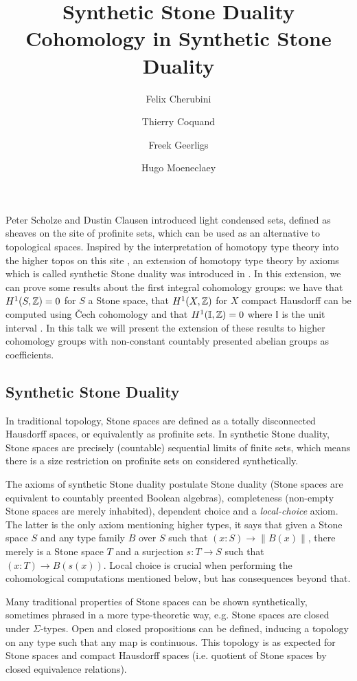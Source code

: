 \documentclass{../util/zariski}
\title{Synthetic Stone Duality 
}
\author{
Felix Cherubini %
\and 
 Thierry Coquand%
\and 
 Freek Geerligs%
\and
 Hugo Moeneclaey %
}
\title{Cohomology in Synthetic Stone Duality}
\begin{document}
\maketitle
Peter Scholze and Dustin Clausen \cite{Scholze} introduced light condensed sets, defined as sheaves on the site of profinite sets, which can be used as an alternative to topological spaces. 
Inspired by the interpretation of homotopy type theory into the higher topos on this site \cite{shulman2019all}, an extension of homotopy type theory by axioms which is called synthetic Stone duality was introduced in \cite{synthetic-stone-duality}. In this extension, we can prove some results about the first integral cohomology groups: we have that $H^1(S,\mathbb{Z}) = 0$ for $S$ a Stone space, that $H^1(X,\mathbb{Z})$ for $X$ compact Hausdorff can be computed using \v{C}ech cohomology and that $H^1(\mathbb{I},\mathbb{Z}) = 0$ where $\mathbb{I}$ is the unit interval \cite{synthetic-stone-duality}. In this talk we will present the extension of these results to higher cohomology groups with non-constant countably presented abelian groups as coefficients.

\subsection*{Synthetic Stone Duality}

In traditional topology, Stone spaces are defined as a totally disconnected Hausdorff spaces, or equivalently as profinite sets. In synthetic Stone duality, Stone spaces are precisely (countable) sequential limits of finite sets, which means there is a size restriction on profinite sets on considered synthetically. 

The axioms of synthetic Stone duality postulate Stone duality (Stone spaces are equivalent to countably preented Boolean algebras), completeness (non-empty Stone spaces are merely inhabited), dependent choice and a \emph{local-choice} axiom. The latter is the only axiom mentioning higher types, it says that given a Stone space $S$ and any type family $B$ over $S$ such that $(x:S)\to \| B(x)  \|$, there merely is a Stone space $T$ and a surjection $s:T\to S$ such that $(x:T)\to B(s(x))$. Local choice is crucial when performing the cohomological computations mentioned below, but has consequences beyond that.

Many traditional properties of Stone spaces can be shown synthetically, sometimes phrased in a more type-theoretic way, e.g. Stone spaces are closed under $\Sigma$-types. Open and closed propositions can be defined, inducing a topology on any type such that any map is continuous. This topology is as expected for Stone spaces and compact Hausdorff spaces (i.e. quotient of Stone spaces by closed equivalence relations).
\end{document}
